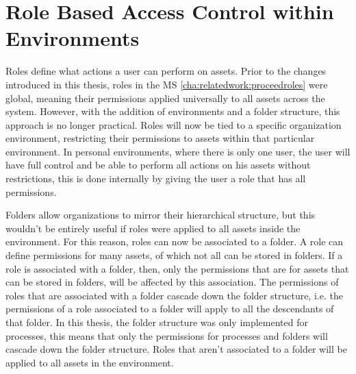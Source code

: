 \section{Role Based Access Control within Environments}
\label{cha:conceptanddesign:roles}

Roles define what actions a user can perform on assets.
Prior to the changes introduced in this thesis,
roles in the MS \ref{cha:relatedwork:proceedroles} were global,
meaning their permissions applied universally to all assets across the system.
However, with the addition of environments and a folder structure, this approach is no
longer practical.
Roles will now be tied to a specific organization environment,
restricting their permissions to assets within that particular environment.
In personal environments, where there is only one user, the user will have
full control and be able to perform all actions on his assets without restrictions,
this is done internally by giving the user a role that has all permissions.

Folders allow organizations to mirror their hierarchical structure, but this wouldn't be
entirely useful if roles were applied to all assets inside the environment.
For this reason, roles can now be associated to a folder.
%
A role can define permissions for many assets, of which not all can be stored in folders.
If a role is associated with a folder, then, only the permissions that are for assets that
can be stored in folders, will be affected by this association.
%
The permissions of roles that are associated with a folder cascade down the
folder structure, i.e. the permissions of a role associated to a folder will 
apply to all the descendants of that folder.
In this thesis, the folder structure was only implemented for processes,
this means that only the permissions for processes and folders will 
cascade down the folder structure.
Roles that aren't associated to a folder will be applied to all assets in the environment.

